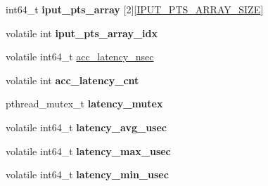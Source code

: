 {\bf }\par
\begin{DoxyCompactItemize}
\item 
int64\+\_\+t {\bfseries iput\+\_\+pts\+\_\+array} \mbox{[}2\mbox{]}\mbox{[}\hyperlink{proc_8h_af53db00bc88282285037381807cc5c1d}{I\+P\+U\+T\+\_\+\+P\+T\+S\+\_\+\+A\+R\+R\+A\+Y\+\_\+\+S\+I\+ZE}\mbox{]}\hypertarget{structproc__ctx__s_afe00d8671976a864711e0db2841c5964}{}\label{structproc__ctx__s_afe00d8671976a864711e0db2841c5964}

\item 
volatile int {\bfseries iput\+\_\+pts\+\_\+array\+\_\+idx}\hypertarget{structproc__ctx__s_a143dc31fd44936ccafe2ecdaeef20ad6}{}\label{structproc__ctx__s_a143dc31fd44936ccafe2ecdaeef20ad6}

\end{DoxyCompactItemize}

{\bf }\par
\begin{DoxyCompactItemize}
\item 
volatile int64\+\_\+t \hyperlink{structproc__ctx__s_a58e7e20b896b1d74789f2fe9b971fd09}{acc\+\_\+latency\+\_\+nsec}
\item 
volatile int {\bfseries acc\+\_\+latency\+\_\+cnt}\hypertarget{structproc__ctx__s_a3dea6eaed00798ceac47451e5923dc41}{}\label{structproc__ctx__s_a3dea6eaed00798ceac47451e5923dc41}

\item 
pthread\+\_\+mutex\+\_\+t {\bfseries latency\+\_\+mutex}\hypertarget{structproc__ctx__s_ac9705b88786b067a17f84178d52bbce1}{}\label{structproc__ctx__s_ac9705b88786b067a17f84178d52bbce1}

\item 
volatile int64\+\_\+t {\bfseries latency\+\_\+avg\+\_\+usec}\hypertarget{structproc__ctx__s_acdd3cc73dadcf7eb7c70c6e5ffb53293}{}\label{structproc__ctx__s_acdd3cc73dadcf7eb7c70c6e5ffb53293}

\item 
volatile int64\+\_\+t {\bfseries latency\+\_\+max\+\_\+usec}\hypertarget{structproc__ctx__s_a5cbe8711ddd1b36a2b203cfc8ef1b01f}{}\label{structproc__ctx__s_a5cbe8711ddd1b36a2b203cfc8ef1b01f}

\item 
volatile int64\+\_\+t {\bfseries latency\+\_\+min\+\_\+usec}\hypertarget{structproc__ctx__s_a0546eedba9aabcc7edc958f1ccc8cd42}{}\label{structproc__ctx__s_a0546eedba9aabcc7edc958f1ccc8cd42}

\end{DoxyCompactItemize}



